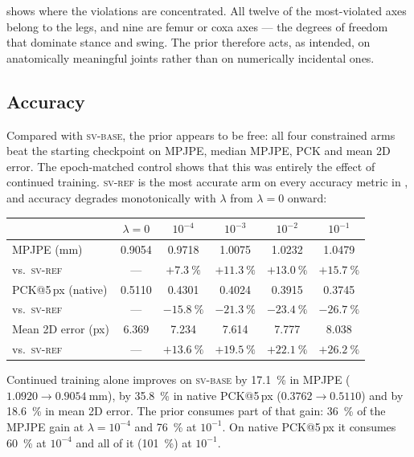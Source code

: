 \documentclass[11pt,a4paper]{article}
\newcommand{\lam}{\lambda}
\newcommand{\armref}{\textsc{sv-ref}}
\newcommand{\armbase}{\textsc{sv-base}}
\begin{document}
 shows where the violations are concentrated. All twelve of the
most-violated axes belong to the legs, and nine are femur or coxa axes
--- the degrees of freedom that dominate stance and swing. The prior therefore
acts, as intended, on anatomically meaningful joints rather than on numerically
incidental ones.

\subsection{Accuracy}
\label{sec:res-acc}

Compared with \armbase{}, the prior appears to be free: all four constrained
arms beat the starting checkpoint on MPJPE, median MPJPE, PCK and mean 2D
error. The epoch-matched control shows that this was entirely the effect of
continued training. \armref{} is the most accurate arm on every accuracy
metric in , and accuracy degrades monotonically with $\lam$
from $\lam = 0$ onward:
\begin{center}
\begin{tabular}{lccccc}
\toprule
 & $\lam=0$ & $10^{-4}$ & $10^{-3}$ & $10^{-2}$ & $10^{-1}$ \\
\midrule
MPJPE (mm)            & 0.9054 & 0.9718 & 1.0075 & 1.0232 & 1.0479 \\
\quad vs.\ \armref{}  & ---    & $+\SI{7.3}{\percent}$ & $+\SI{11.3}{\percent}$ & $+\SI{13.0}{\percent}$ & $+\SI{15.7}{\percent}$ \\
PCK@5\,px (native)    & 0.5110 & 0.4301 & 0.4024 & 0.3915 & 0.3745 \\
\quad vs.\ \armref{}  & ---    & $-\SI{15.8}{\percent}$ & $-\SI{21.3}{\percent}$ & $-\SI{23.4}{\percent}$ & $-\SI{26.7}{\percent}$ \\
Mean 2D error (px)    & 6.369  & 7.234  & 7.614  & 7.777  & 8.038  \\
\quad vs.\ \armref{}  & ---    & $+\SI{13.6}{\percent}$ & $+\SI{19.5}{\percent}$ & $+\SI{22.1}{\percent}$ & $+\SI{26.2}{\percent}$ \\
\bottomrule
\end{tabular}
\end{center}
Continued training alone improves on \armbase{} by \SI{17.1}{\percent} in
MPJPE ($1.0920 \rightarrow \SI{0.9054}{\milli\metre}$), by \SI{35.8}{\percent}
in native PCK@5\,px ($0.3762 \rightarrow 0.5110$) and by \SI{18.6}{\percent} in
mean 2D error. The prior consumes part of that gain: \SI{36}{\percent} of the
MPJPE gain at $\lam = 10^{-4}$ and \SI{76}{\percent} at $10^{-1}$. On native
PCK@5\,px it consumes \SI{60}{\percent} at $10^{-4}$ and all of it
(\SI{101}{\percent}) at $10^{-1}$.
\end{document}

